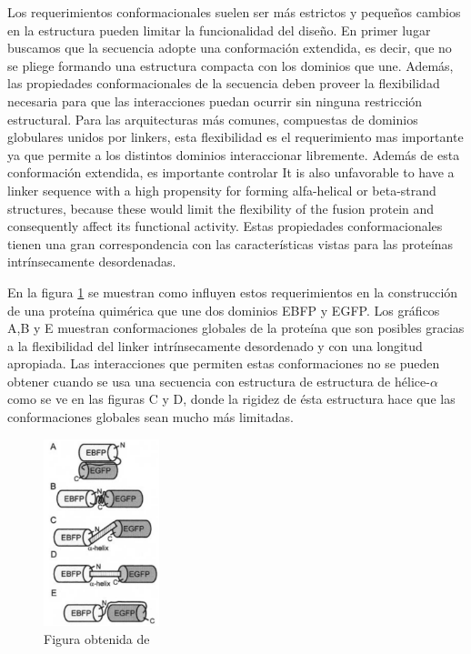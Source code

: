 Los requerimientos conformacionales suelen ser más estrictos y pequeños cambios en la estructura pueden limitar la funcionalidad del diseño.
En primer lugar buscamos que la secuencia adopte una conformación extendida, es decir, que no se pliege formando una estructura compacta con los dominios que une. 
Además, las propiedades conformacionales de la secuencia deben proveer la flexibilidad necesaria para que las interacciones puedan ocurrir sin ninguna restricción estructural.
Para las arquitecturas más comunes, compuestas de dominios globulares unidos por linkers, esta flexibilidad es el requerimiento mas importante ya que permite a los distintos dominios interaccionar libremente.
Además de esta conformación extendida, es importante controlar 
It is also unfavorable to have a linker sequence with a high propensity for forming alfa-helical or beta-strand structures, because these would limit the flexibility of the fusion protein and consequently affect its functional activity.
Estas propiedades conformacionales tienen una gran correspondencia con las características vistas para las proteínas intrínsecamente desordenadas. 

En la figura \ref{conformacionLinker} se muestran como influyen estos requerimientos en la construcción de una proteína quimérica que une dos dominios EBFP y EGFP. 
Los gráficos A,B y E muestran conformaciones globales de la proteína que son posibles gracias a la flexibilidad del linker intrínsecamente desordenado y con una longitud apropiada. 
Las interacciones que permiten estas conformaciones no se pueden obtener cuando se usa una secuencia con estructura de estructura de hélice-$\alpha$ como se ve en las figuras C y D, donde la rigidez de ésta estructura 
hace que las conformaciones globales sean mucho más limitadas.


\begin{figure}[htbp]
\centering
\includegraphics[width=0.3\textwidth]{img/conformacionLinker.png} 
\caption{Figura obtenida de \cite{arai2004conformations}}
\label{conformacionLinker}
\end{figure}



